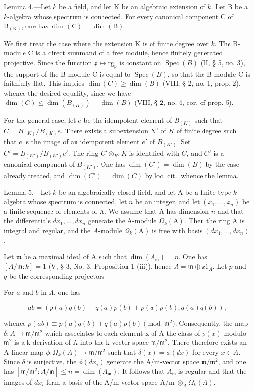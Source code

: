 Lemma 4.—Let \(k\) be a field, and let K be an algebraic extension of \(k\). Let B be a \(k\)-algebra whose spectrum is connected. For every canonical component C of \(\mathrm{B}_{(\mathrm{K})}\), one has \(\dim(\mathrm{C}) = \dim(\mathrm{B})\).

We first treat the case where the extension K is of finite degree over \(k\). The B-module C is a direct summand of a free module, hence finitely generated projective. Since the function \(\mathfrak{p} \mapsto \mathrm{rg}_{\mathfrak{p}}\) is constant on \(\operatorname{Spec}(B)\) (II, § 5, no. 3), the support of the B-module C is equal to \(\operatorname{Spec}(B)\), so that the B-module C is faithfully flat. This implies \(\dim(C) \geqslant \dim(B)\) (VIII, § 2, no. 1, prop. 2), whence the desired equality, since we have \(\dim(C) \leqslant \dim(B_{(K)}) = \dim(B)\) (VIII, § 2, no. 4, cor. of prop. 5).

For the general case, let \(e\) be the idempotent element of \(B_{(K)}\) such that \(C = B_{(K)}/B_{(K)}e\). There exists a subextension \(K'\) of \(K\) of finite degree such that \(e\) is the image of an idempotent element \(e'\) of \(B_{(K')}\). Set \(C' = B_{(K')} / B_{(K')}e'\). The ring \(C' \otimes_{K'} K\) is identified with \(C\), and \(C'\) is a canonical component of \(B_{(K')}\). One has \(\dim(C') = \dim(B)\) by the case already treated, and \(\dim(C') = \dim(C)\) by loc. cit., whence the lemma.

Lemma 5.—Let \(k\) be an algebraically closed field, and let A be a finite-type \(k\)-algebra whose spectrum is connected, let \(n\) be an integer, and let \((x_{1},\ldots,x_{n})\) be a finite sequence of elements of A. We assume that A has dimension \(n\) and that the differentials \(dx_{1},\ldots,dx_{n}\) generate the A-module \(\Omega_{k}(\mathrm{A})\). Then the ring A is integral and regular, and the \(A\)-module \(\Omega_{k}(\mathrm{A})\) is free with basis \((dx_{1},\ldots,dx_{n})\).

Let \(\mathfrak{m}\) be a maximal ideal of A such that \(\dim(A_{\mathfrak{m}})=n\). One has \([A/\mathfrak{m}:k]=1\) (V, § 3, No. 3, Proposition 1 (iii)), hence \(A=\mathfrak{m}\oplus k1_{A}\). Let \(p\) and \(q\) be the corresponding projectors

For \(a\) and \(b\) in \(A\), one has

\[
a b = \left(p (a) q (b) + q (a) p (b) + p (a) p (b), q (a) q (b)\right),
\]

whence \(p(ab) \equiv p(a)q(b) + q(a)p(b) \pmod{\mathfrak{m}^{2}}\). Consequently, the map \(\delta: A \to \mathfrak{m}/\mathfrak{m}^{2}\) which associates to each element x of A the class of \(p(x)\) modulo \(\mathfrak{m}^{2}\) is a k-derivation of A into the k-vector space \(\mathfrak{m}/\mathfrak{m}^{2}\). There therefore exists an A-linear map \(\phi: \Omega_{k}(A) \to \mathfrak{m}/\mathfrak{m}^{2}\) such that \(\delta(x) = \phi(dx)\) for every \(x \in A\). Since \(\delta\) is surjective, the \(\phi(dx_{i})\) generate the A/m-vector space \(\mathfrak{m}/\mathfrak{m}^{2}\), and one has \([\mathfrak{m}/\mathfrak{m}^{2}: A/\mathfrak{m}] \leqslant n = \dim(A_{\mathfrak{m}})\). It follows that \(A_{\mathfrak{m}}\) is regular and that the images of \(dx_{i}\) form a basis of the A/m-vector space A/m \(\otimes_{A} \Omega_{k}(A)\).


